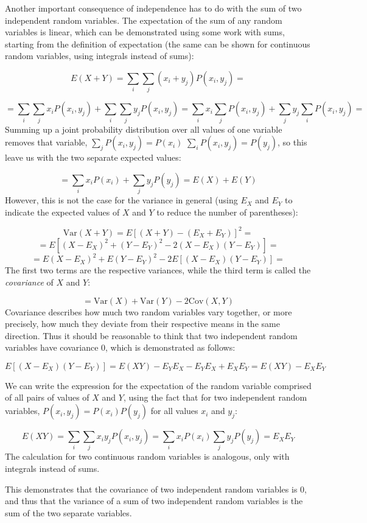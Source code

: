 \documentclass[
  letterpaper,
  DIV=11,
  numbers=noendperiod]{scrreprt}
\begin{document}
Another important consequence of independence has to do with the sum of
two independent random variables. The expectation of the sum of any
random variables is linear, which can be demonstrated using some work
with sums, starting from the definition of expectation (the same can be
shown for continuous random variables, using integrals instead of sums):

\[E(X + Y) = \sum_i \sum_j (x_i + y_j) P(x_i, y_j) =\]

\[= \sum_i \sum_j x_iP(x_i, y_j) + \sum_i \sum_j y_j P(x_i, y_j) = \sum_i x_i \sum_j P(x_i, y_j) + \sum_j y_j \sum_i  P(x_i, y_j) = \]
Summing up a joint probability distribution over all values of one
variable removes that variable, \(\sum_j P(x_i, y_j) = P(x_i)\)
\(\sum_i P(x_i, y_j) = P(y_j)\), so this leave us with the two separate
expected values:

\[= \sum_i x_i P(x_i) + \sum_j y_j P(y_j) = E(X) + E(Y)\] However, this
is not the case for the variance in general (using \(E_X\) and \(E_Y\)
to indicate the expected values of \(X\) and \(Y\) to reduce the number
of parentheses):

\[\text{Var}(X+Y) = E \left[ (X+Y)-(E_X+E_Y) \right]^2 = \]
\[=E[ (X-E_X)^2 +(Y-E_Y)^2 - 2(X-E_X)(Y-E_Y)] =  \]
\[=E (X-E_X)^2 +  E(Y-E_Y)^2 - 2 E[(X-E_X)(Y-E_Y)]  = \] The first two
terms are the respective variances, while the third term is called the
\emph{covariance} of \(X\) and \(Y\):

\[= \text{Var}(X) + \text{Var}(Y) - 2 \text{Cov}(X,Y) \] Covariance
describes how much two random variables vary together, or more
precisely, how much they deviate from their respective means in the same
direction. Thus it should be reasonable to think that two independent
random variables have covariance 0, which is demonstrated as follows:

\[E[(X-E_X)(Y-E_Y)] = E(XY) - E_Y E_X - E_YE_X + E_XE_Y = E(XY) - E_X E_Y  \]

We can write the expression for the expectation of the random variable
comprised of all pairs of values of \(X\) and \(Y\), using the fact that
for two independent random variables, \(P(x_i,y_j) = P(x_i)P(y_j)\) for
all values \(x_i\) and \(y_j\):

\[E(XY) = \sum_i \sum_j x_iy_j P(x_i,y_j) = \sum_i x_i P(x_i) \sum_j y_j P(y_j) = E_X E_Y\]
The calculation for two continuous random variables is analogous, only
with integrals instead of sums.

This demonstrates that the covariance of two independent random
variables is 0, and thus that the variance of a sum of two independent
random variables is the sum of the two separate variables.
\end{document}
